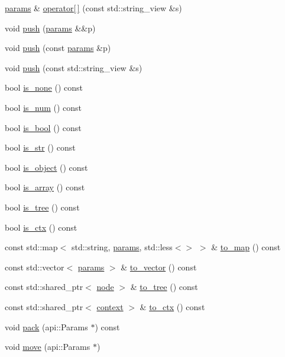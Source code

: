 \begin{DoxyCompactItemize}
\hyperlink{classtelegraph_1_1params}{params} \& \hyperlink{classtelegraph_1_1params_ae33b9535de4e28e9b4d6631cccbce970}{operator\mbox{[}$\,$\mbox{]}} (const std\+::string\+\_\+view \&s)
\item 
void \hyperlink{classtelegraph_1_1params_a738dbb2008fe561a64b6880bd1c5f0fc}{push} (\hyperlink{classtelegraph_1_1params}{params} \&\&p)
\item 
void \hyperlink{classtelegraph_1_1params_a8d7b23780508e6ccb37fabc3fc24ed88}{push} (const \hyperlink{classtelegraph_1_1params}{params} \&p)
\item 
void \hyperlink{classtelegraph_1_1params_a4dbcc0f56b0a8cc959e0ff806da8bbf9}{push} (const std\+::string\+\_\+view \&s)
\item 
bool \hyperlink{classtelegraph_1_1params_a8b00e3b9bf353b8f697e4fd46389474a}{is\+\_\+none} () const
\item 
bool \hyperlink{classtelegraph_1_1params_a17bb9025c603d54dd50ad95bf75fa0df}{is\+\_\+num} () const
\item 
bool \hyperlink{classtelegraph_1_1params_ad3a1f92014ae1a68b12e1a46c41e91a7}{is\+\_\+bool} () const
\item 
bool \hyperlink{classtelegraph_1_1params_afb481d6d12c2dcc84aef802daeef225b}{is\+\_\+str} () const
\item 
bool \hyperlink{classtelegraph_1_1params_a726f9a09f6469bbf7c533c0c8e485c72}{is\+\_\+object} () const
\item 
bool \hyperlink{classtelegraph_1_1params_a6b24e2e5d56f0a05f3d27f4ed73361ca}{is\+\_\+array} () const
\item 
bool \hyperlink{classtelegraph_1_1params_a37fde85a48b80674c71e35239c3b17ce}{is\+\_\+tree} () const
\item 
bool \hyperlink{classtelegraph_1_1params_a144dfba3d2244d6af683054e70d756ca}{is\+\_\+ctx} () const
\item 
const std\+::map$<$ std\+::string, \hyperlink{classtelegraph_1_1params}{params}, std\+::less$<$$>$ $>$ \& \hyperlink{classtelegraph_1_1params_a28ac587e330dc76ecb08fd3fbc19dd3a}{to\+\_\+map} () const
\item 
const std\+::vector$<$ \hyperlink{classtelegraph_1_1params}{params} $>$ \& \hyperlink{classtelegraph_1_1params_a7974e92445024059fa346347f479fc9c}{to\+\_\+vector} () const
\item 
const std\+::shared\+\_\+ptr$<$ \hyperlink{classtelegraph_1_1node}{node} $>$ \& \hyperlink{classtelegraph_1_1params_a175321ac3b799e5ea941edcd48fd4b64}{to\+\_\+tree} () const
\item 
const std\+::shared\+\_\+ptr$<$ \hyperlink{classtelegraph_1_1context}{context} $>$ \& \hyperlink{classtelegraph_1_1params_a9c2e5ddc7236063fc7b0066fecb5b52a}{to\+\_\+ctx} () const
\item 
void \hyperlink{classtelegraph_1_1params_ad07afe221473ae0ffb0ddcf29232d553}{pack} (api\+::\+Params $\ast$) const
\item 
void \hyperlink{classtelegraph_1_1params_a4d4df793ec88d5774a8f9a0fdb23405c}{move} (api\+::\+Params $\ast$)
\end{DoxyCompactItemize}
